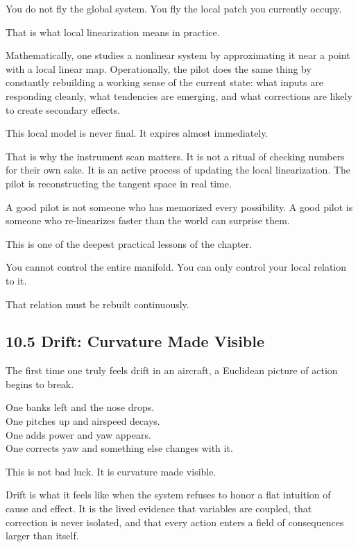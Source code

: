 You do not fly the global system. You fly the local patch you currently
occupy.

That is what local linearization means in practice.

Mathematically, one studies a nonlinear system by approximating it near
a point with a local linear map. Operationally, the pilot does the same
thing by constantly rebuilding a working sense of the current state:
what inputs are responding cleanly, what tendencies are emerging, and
what corrections are likely to create secondary effects.

This local model is never final. It expires almost immediately.

That is why the instrument scan matters. It is not a ritual of checking
numbers for their own sake. It is an active process of updating the
local linearization. The pilot is reconstructing the tangent space in
real time.

A good pilot is not someone who has memorized every possibility. A good
pilot is someone who re-linearizes faster than the world can surprise
them.

This is one of the deepest practical lessons of the chapter.

You cannot control the entire manifold. You can only control your local
relation to it.

That relation must be rebuilt continuously.

\hypertarget{drift-curvature-made-visible}{%
\subsection{10.5 Drift: Curvature Made
Visible}\label{drift-curvature-made-visible}}

The first time one truly feels drift in an aircraft, a Euclidean picture
of action begins to break.

One banks left and the nose drops.\\
One pitches up and airspeed decays.\\
One adds power and yaw appears.\\
One corrects yaw and something else changes with it.

This is not bad luck. It is curvature made visible.

Drift is what it feels like when the system refuses to honor a flat
intuition of cause and effect. It is the lived evidence that variables
are coupled, that correction is never isolated, and that every action
enters a field of consequences larger than itself.

